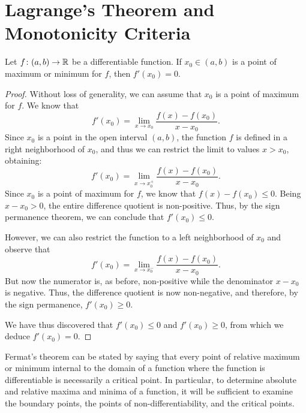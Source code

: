 \section{Lagrange's Theorem and Monotonicity Criteria}

\begin{theorem}[Fermat]
\mymark{***}
Let $f\colon (a,b)\to {\mathbb R}$ be a differentiable function.
If $x_0\in (a,b)$ is a point of maximum or minimum for $f$, then
$f'(x_0)=0$.
\end{theorem}
%
\begin{proof}
\mymark{***}
Without loss of generality, we can assume that $x_0$ is a point of maximum for
$f$.
We know that
\[
  f'(x_0) = \lim_{x\to x_0}\frac{f(x)-f(x_0)}{x-x_0}.
\]
Since $x_0$ is a point in the open interval $(a,b)$, the function $f$ is defined
in a right neighborhood of $x_0$, and thus we can restrict the limit to values
$x>x_0$, obtaining:
\[
  f'(x_0) = \lim_{x\to x_0^+}\frac{f(x) - f(x_0)}{x-x_0}.
\]
Since $x_0$ is a point of maximum for $f$, we know that $f(x)-f(x_0)\le 0$.
Being $x-x_0>0$, the entire difference quotient is non-positive.
Thus, by the sign permanence theorem,
we can conclude that $f'(x_0)\le 0$.

However, we can also restrict the function to a left neighborhood of $x_0$ and
observe that
\[
  f'(x_0) = \lim_{x\to x_0^-}\frac{f(x)-f(x_0)}{x-x_0}.
\]
But now the numerator is, as before, non-positive while the denominator $x-x_0$
is negative. Thus, the difference quotient is now non-negative, and therefore,
by the sign permanence, $f'(x_0) \ge 0$.

We have thus discovered that $f'(x_0)\le 0$ and $f'(x_0)\ge 0$, from which we
deduce $f'(x_0)=0$.
\end{proof}

Fermat's theorem can be stated by saying that every point of relative maximum or
minimum internal to the domain of a function where the function is
differentiable is necessarily a critical point.
In particular, to determine absolute and relative maxima and minima of a
function, it will be sufficient to examine the boundary points, the points of
non-differentiability, and the critical points.

